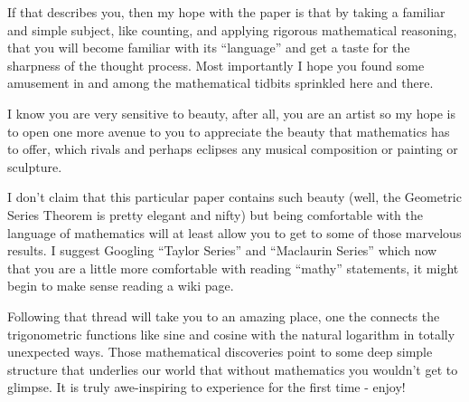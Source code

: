 \documentclass{article}
\begin{document}
If that describes you, then
my hope with the paper is that by
taking a familiar and simple subject, like counting, and applying rigorous mathematical reasoning,
that you will become familiar with its ``language'' and get a taste for the
sharpness of the thought process. Most importantly I hope
you found some amusement in and among the mathematical tidbits sprinkled here
and there.

I know you are very sensitive to beauty, after all, you are an artist
so my hope is to open one more avenue to you to appreciate 
the beauty that mathematics has to offer, which rivals and perhaps eclipses any
musical composition or painting or sculpture.

I don't claim that this particular paper contains such beauty (well, the Geometric Series Theorem is pretty
elegant and nifty) but being comfortable with the language of mathematics will at least allow
you to get to some of those marvelous results. I suggest Googling ``Taylor Series'' and ``Maclaurin Series''
which now that you are a little more comfortable with reading ``mathy'' statements, it might
begin to make sense reading a wiki page.

Following that thread will take you to an amazing place, one the connects the trigonometric functions
like sine and cosine with the natural logarithm in totally unexpected ways. Those mathematical
discoveries point to some deep simple structure that underlies our world that without mathematics
you wouldn't get to glimpse. It is truly awe-inspiring to experience for the first time - enjoy!
\end{document}
